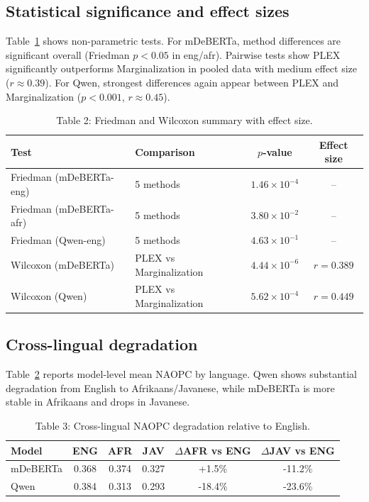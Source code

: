 \documentclass[11pt]{article}
\begin{document}
\subsection{Statistical significance and effect sizes}
Table~\ref{tab:stats} shows non-parametric tests. For mDeBERTa, method differences are significant overall (Friedman $p<0.05$ in eng/afr). Pairwise tests show PLEX significantly outperforms Marginalization in pooled data with medium effect size ($r\approx0.39$). For Qwen, strongest differences again appear between PLEX and Marginalization ($p<0.001$, $r\approx0.45$).

\begin{table}[H]
\centering
\caption{Table 2: Friedman and Wilcoxon summary with effect size.}
\label{tab:stats}
\begin{tabular}{llcc}
\toprule
Test & Comparison & $p$-value & Effect size \\
\midrule
Friedman (mDeBERTa-eng) & 5 methods & $1.46\times10^{-4}$ & -- \\
Friedman (mDeBERTa-afr) & 5 methods & $3.80\times10^{-2}$ & -- \\
Friedman (Qwen-eng) & 5 methods & $4.63\times10^{-1}$ & -- \\
Wilcoxon (mDeBERTa) & PLEX vs Marginalization & $4.44\times10^{-6}$ & $r=0.389$ \\
Wilcoxon (Qwen) & PLEX vs Marginalization & $5.62\times10^{-4}$ & $r=0.449$ \\
\bottomrule
\end{tabular}
\end{table}

\subsection{Cross-lingual degradation}
Table~\ref{tab:degradation} reports model-level mean NAOPC by language. Qwen shows substantial degradation from English to Afrikaans/Javanese, while mDeBERTa is more stable in Afrikaans and drops in Javanese.

\begin{table}[H]
\centering
\caption{Table 3: Cross-lingual NAOPC degradation relative to English.}
\label{tab:degradation}
\begin{tabular}{lccccc}
\toprule
Model & ENG & AFR & JAV & $\Delta$AFR vs ENG & $\Delta$JAV vs ENG \\
\midrule
mDeBERTa & 0.368 & 0.374 & 0.327 & +1.5\% & -11.2\% \\
Qwen & 0.384 & 0.313 & 0.293 & -18.4\% & -23.6\% \\
\bottomrule
\end{tabular}
\end{table}
\end{document}
